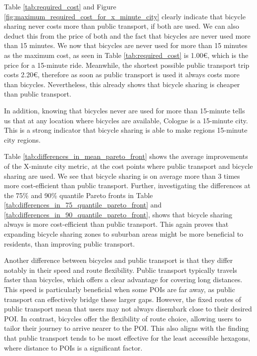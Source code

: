 Table \ref{tab:required_cost} and Figure \ref{fig:maximum_required_cost_for_x_minute_city} clearly indicate that bicycle sharing never costs more than public transport, if both are used.
We can also deduct this from the price of both and the fact that bicycles are never used more than 15 minutes.
We now that bicycles are never used for more than 15 minutes as the maximum cost, as seen in Table \ref{tab:required_cost} is 1.00€, which is the price for a 15-minute ride.
Meanwhile, the shortest possible public transport trip costs 2.20€, therefore as soon as public transport is used it always costs more than bicycles.
Nevertheless, this already shows that bicycle sharing is cheaper than public transport. 

In addition, knowing that bicycles never are used for more than 15-minute tells us that at any location where bicycles are available, Cologne is a 15-minute city.
This is a strong indicator that bicycle sharing is able to make regions 15-minute city regions.

Table \ref{tab:differences_in_mean_pareto_front} shows the average improvements of the X-minute city metric, at the cost points where public transport and bicycle sharing are used.
We see that bicycle sharing is on average more than 3 times more cost-efficient than public transport.
Further, investigating the differences at the 75\% and 90\% quantile Pareto fronts in Table \ref{tab:differences_in_75_quantile_pareto_front} and \ref{tab:differences_in_90_quantile_pareto_front}, shows that bicycle sharing always is more cost-efficient than public transport.
This again proves that expanding bicycle sharing zones to suburban areas might be more beneficial to residents, than improving public transport.


Another difference between bicycles and public transport is that they differ notably in their speed and route flexibility. 
Public transport typically travels faster than bicycles, which offers a clear advantage for covering long distances. 
This speed is particularly beneficial when some POIs are far away, as public transport can effectively bridge these larger gaps. 
However, the fixed routes of public transport mean that users may not always disembark close to their desired POI. 
In contrast, bicycles offer the flexibility of route choice, allowing users to tailor their journey to arrive nearer to the POI. 
This also aligns with the finding that public transport tends to be most effective for the least accessible hexagons, where distance to POIs is a significant factor.


